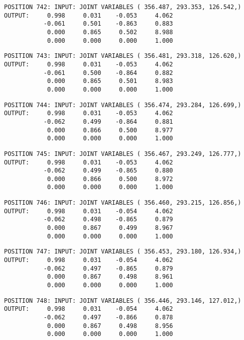 \begin{verbatim}
POSITION 742: INPUT: JOINT VARIABLES ( 356.487, 293.353, 126.542,)
OUTPUT:     0.998     0.031    -0.053     4.062
           -0.061     0.501    -0.863     0.883
            0.000     0.865     0.502     8.988
            0.000     0.000     0.000     1.000
\end{verbatim} \pagebreak[1]\begin{verbatim}
POSITION 743: INPUT: JOINT VARIABLES ( 356.481, 293.318, 126.620,)
OUTPUT:     0.998     0.031    -0.053     4.062
           -0.061     0.500    -0.864     0.882
            0.000     0.865     0.501     8.983
            0.000     0.000     0.000     1.000
\end{verbatim} \pagebreak[1]\begin{verbatim}
POSITION 744: INPUT: JOINT VARIABLES ( 356.474, 293.284, 126.699,)
OUTPUT:     0.998     0.031    -0.053     4.062
           -0.062     0.499    -0.864     0.881
            0.000     0.866     0.500     8.977
            0.000     0.000     0.000     1.000
\end{verbatim} \pagebreak[1]\begin{verbatim}
POSITION 745: INPUT: JOINT VARIABLES ( 356.467, 293.249, 126.777,)
OUTPUT:     0.998     0.031    -0.053     4.062
           -0.062     0.499    -0.865     0.880
            0.000     0.866     0.500     8.972
            0.000     0.000     0.000     1.000
\end{verbatim} \pagebreak[1]\begin{verbatim}
POSITION 746: INPUT: JOINT VARIABLES ( 356.460, 293.215, 126.856,)
OUTPUT:     0.998     0.031    -0.054     4.062
           -0.062     0.498    -0.865     0.879
            0.000     0.867     0.499     8.967
            0.000     0.000     0.000     1.000
\end{verbatim} \pagebreak[1]\begin{verbatim}
POSITION 747: INPUT: JOINT VARIABLES ( 356.453, 293.180, 126.934,)
OUTPUT:     0.998     0.031    -0.054     4.062
           -0.062     0.497    -0.865     0.879
            0.000     0.867     0.498     8.961
            0.000     0.000     0.000     1.000
\end{verbatim} \pagebreak[1]\begin{verbatim}
POSITION 748: INPUT: JOINT VARIABLES ( 356.446, 293.146, 127.012,)
OUTPUT:     0.998     0.031    -0.054     4.062
           -0.062     0.497    -0.866     0.878
            0.000     0.867     0.498     8.956
            0.000     0.000     0.000     1.000
\end{verbatim} \pagebreak[1]\begin{verbatim}

\end{verbatim}
